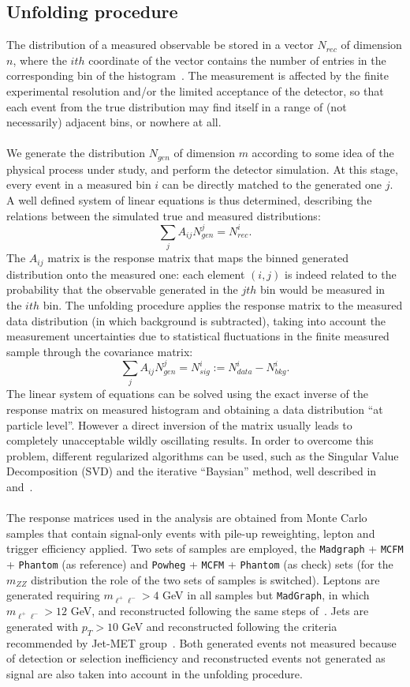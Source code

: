 \subsection{Unfolding procedure}
The distribution of a measured observable be stored in a vector $N_{rec}$ of dimension $n$, where the $ith$ coordinate of the vector contains the number of entries in the corresponding bin of the histogram~\cite{SVD, SMP-14-016}. The measurement is affected by the finite experimental resolution and/or the limited acceptance of the detector, so that each event from the true distribution may find itself in a range of (not necessarily) adjacent bins, or nowhere at all.\\
\\
We generate the distribution $N_{gen}$ of dimension $m$ according to some idea of the physical process under study, and perform the detector simulation. At this stage, every event in a measured bin $i$ can be directly matched to the generated one $j$. A well defined system of linear equations is thus determined, describing the relations between the simulated true and measured distributions:
$$\sum_{j}A_{ij}N^{j}_{gen}=N^{i}_{rec}.$$
The $A_{ij}$ matrix is the response matrix that maps the binned generated distribution onto the measured one: each element $(i,j)$ is indeed related to the 
probability that the observable generated in the $jth$ bin would be measured in the $ith$ bin. The unfolding procedure applies the response matrix to the 
measured data distribution (in which background is subtracted), taking into account the measurement uncertainties due to statistical fluctuations 
in the finite measured sample through the covariance matrix:
$$\sum_{j}A_{ij}N^{j}_{gen}=N^{i}_{sig} := N_{data}^{i}-N^{i}_{bkg}.$$
The linear system of equations can be solved using the exact inverse of the response matrix on measured histogram and obtaining a data distribution 
``at particle level''. However a direct inversion of the matrix usually leads to completely unacceptable wildly oscillating results. In order to overcome this 
problem, different regularized algorithms can be used, such as the Singular Value Decomposition (SVD) and the iterative ``Baysian'' method, well described 
in~\cite{SVD} and~\cite{DAgostini}.\\
\\
The response matrices used in the analysis are obtained from Monte Carlo samples that contain signal-only events with pile-up reweighting, lepton and trigger efficiency applied. Two sets of samples are employed, the \texttt{Madgraph} + \texttt{MCFM} + \texttt{Phantom} (as reference) and \texttt{Powheg} + \texttt{MCFM} + \texttt{Phantom} (as check) sets (for the $m_{ZZ}$ distribution the role of the two sets of samples is switched). Leptons are generated requiring  $m_{\ell^{+}\ell^{-}}> 4$ GeV in all samples but \texttt{MadGraph}, in which  $m_{\ell^{+}\ell^{-}} > 12$ GeV, and reconstructed  following the same steps of~\cite{HiggsLegacyPaper,ZZXSPaper}. Jets are generated with $p_{T} > 10$ GeV and reconstructed following the criteria recommended by Jet-MET group~\cite{JetID}. Both generated events not measured because of detection or selection inefficiency and reconstructed events not generated as signal are also taken into account in the unfolding procedure.\\
